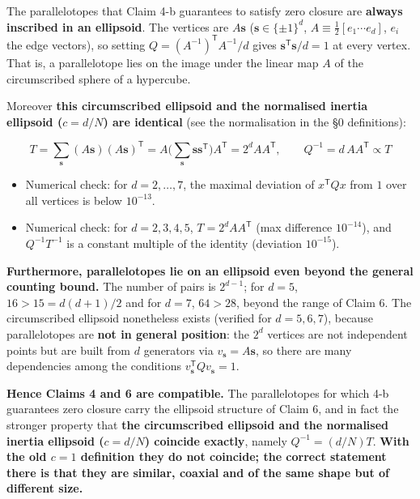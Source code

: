 \documentclass[
  10pt,
]{article}
\newcounter{none} %
\providecommand{\tightlist}{%
  \setlength{\itemsep}{0pt}\setlength{\parskip}{0pt}}
\begin{document}
The parallelotopes that Claim 4-b guarantees to satisfy zero closure are
\textbf{always inscribed in an ellipsoid}. The vertices are
\(A\mathbf{s}\) (\(\mathbf{s}\in\{\pm1\}^d\),
\textbf{\(A \equiv \tfrac12[e_1\cdots e_d]\)}, \(e_i\) the edge
vectors), so setting \(Q = (A^{-1})^{\mathsf T}A^{-1}/d\) gives
\(\mathbf{s}^{\mathsf T}\mathbf{s}/d = 1\) at every vertex. That is, a
parallelotope lies on the image under the linear map \(A\) of the
circumscribed sphere of a hypercube.

Moreover \textbf{this circumscribed ellipsoid and the normalised inertia
ellipsoid (\(c = d/N\)) are identical} (see the normalisation in the §0
definitions):

\[T = \sum_{\mathbf{s}} (A\mathbf{s})(A\mathbf{s})^{\mathsf T} = A\Big(\sum_{\mathbf{s}}\mathbf{s}\mathbf{s}^{\mathsf T}\Big)A^{\mathsf T} = 2^{d}AA^{\mathsf T}, \qquad Q^{-1} = d\,AA^{\mathsf T} \propto T\]

\begin{itemize}
\tightlist
\item
  Numerical check: for \(d=2,\dots,7\), the maximal deviation of
  \(x^{\mathsf T}Qx\) from \(1\) over all vertices is below
  \(10^{-13}\).
\item
  Numerical check: for \(d=2,3,4,5\), \(T = 2^dAA^{\mathsf T}\) (max
  difference \(10^{-14}\)), and \(Q^{-1}T^{-1}\) is a constant multiple
  of the identity (deviation \(10^{-15}\)).
\end{itemize}

\textbf{Furthermore, parallelotopes lie on an ellipsoid even beyond the
general counting bound.} The number of pairs is \(2^{d-1}\); for
\(d=5\), \(16>15=d(d+1)/2\) and for \(d=7\), \(64>28\), beyond the range
of Claim 6. The circumscribed ellipsoid nonetheless exists (verified for
\(d=5,6,7\)), because parallelotopes are \textbf{not in general
position}: the \(2^d\) vertices are not independent points but are built
from \(d\) generators via \(v_{\mathbf s} = A\mathbf{s}\), so there are
many dependencies among the conditions
\(v_{\mathbf s}^{\mathsf T}Qv_{\mathbf s}=1\).

\textbf{Hence Claims 4 and 6 are compatible.} The parallelotopes for
which 4-b guarantees zero closure carry the ellipsoid structure of Claim
6, and in fact the stronger property that \textbf{the circumscribed
ellipsoid and the normalised inertia ellipsoid (\(c=d/N\)) coincide
exactly}, namely \(Q^{-1} = (d/N)T\). \textbf{With the old \(c=1\)
definition they do not coincide; the correct statement there is that
they are similar, coaxial and of the same shape but of different size.}
\end{document}
